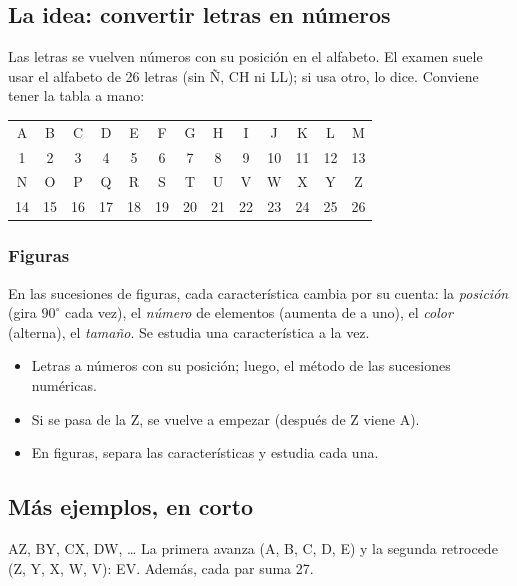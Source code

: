 \bitacora


\subsection{La idea: convertir letras en números}
Las letras se vuelven números con su posición en el alfabeto. El examen suele usar el alfabeto de 26 letras (sin Ñ, CH ni
LL); si usa otro, lo dice. Conviene tener la tabla a mano:

\begin{center}\scriptsize\setlength{\tabcolsep}{2.3pt}
\begin{tabular}{*{13}{c}}
A & B & C & D & E & F & G & H & I & J & K & L & M\\
1 & 2 & 3 & 4 & 5 & 6 & 7 & 8 & 9 & 10 & 11 & 12 & 13\\[3pt]
N & O & P & Q & R & S & T & U & V & W & X & Y & Z\\
14 & 15 & 16 & 17 & 18 & 19 & 20 & 21 & 22 & 23 & 24 & 25 & 26\\
\end{tabular}
\end{center}

\subsubsection{Figuras}
En las sucesiones de figuras, cada característica cambia por su cuenta: la \emph{posición} (gira $90^\circ$ cada vez),
el \emph{número} de elementos (aumenta de a uno), el \emph{color} (alterna), el \emph{tamaño}. Se estudia una
característica a la vez.


\begin{regla}
\begin{itemize}
  \item Letras a números con su posición; luego, el método de las sucesiones numéricas.
  \item Si se pasa de la Z, se vuelve a empezar (después de Z viene A).
  \item En figuras, separa las características y estudia cada una.
\end{itemize}
\end{regla}

\subsection{Más ejemplos, en corto}
\begin{ejemplo}
AZ, BY, CX, DW, …
\solucion La primera avanza (A, B, C, D, E) y la segunda retrocede (Z, Y, X, W, V): EV. Además, cada par suma 27.
\end{ejemplo}


